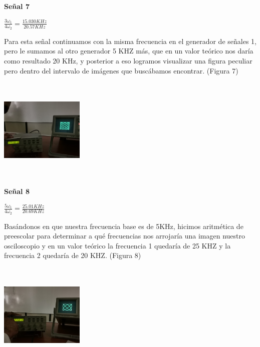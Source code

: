 \documentclass[10pt]{article}
\begin{document}
\begin{multicols}{2}
\textbf{Señal 7}\\
\begin{center}
    
$\frac{3\omega_{1}}{4\omega_{2}}=\frac{15.030 KHz}{20.57 KHz}$\\
\end{center}
Para esta señal continuamos con la misma frecuencia en el generador de señales 1, pero le sumamos al otro generador 5 KHZ más, que en un valor teórico nos daría como resultado 20 KHz, y posterior a eso logramos visualizar una figura peculiar pero dentro del intervalo de imágenes que buscábamos encontrar. (Figura 7)\\
\begin{center}
	\includegraphics[width=4cm,height=5cm]{Imagenes/7.png}
	\label{fig:7}
\end{center}
\textbf{Señal 8}\\
\begin{center}
    
$\frac{5\omega_{1}}{4\omega_{2}}=\frac{25.01 KHz}{20.69 KHz}$\\
\end{center}
Basándonos en que nuestra frecuencia base es de 5KHz, hicimos aritmética de preescolar para determinar a qué frecuencias nos arrojaría una imagen nuestro osciloscopio y en un valor teórico la frecuencia 1 quedaría de 25 KHZ y la frecuencia 2 quedaría de 20 KHZ. (Figura 8)\\
\begin{center}
	\includegraphics[width=4cm,height=5cm]{Imagenes/8.png}
	\label{fig:8}
\end{center}


\end{multicols}
\end{document}
